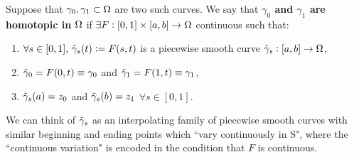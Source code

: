 \begin{definition}
Suppose that $\gamma_0, \gamma_1 \subset \Omega$ are two such curves. We say that \textbf{$\gamma_0$ and $\gamma_1$ are homotopic in $\Omega$} if $\exists F : [0,1] \times [a,b] \to \Omega$ continuous such that:
\begin{enumerate}
    \item $\forall s \in [0,1] , \, \Tilde{\gamma}_s(t) \vcentcolon = F(s,t)$ is a piecewise smooth curve $\Tilde{\gamma}_s : [a,b] \to \Omega$,
    \item $\Tilde{\gamma}_0 = F(0,t) \equiv \gamma_0$ and $\Tilde{\gamma}_1 = F(1,t) \equiv \gamma_1$,
    \item $\Tilde{\gamma}_s(a) = z_0$ and $\Tilde{\gamma}_s(b) = z_1$ $\forall s \in [0,1]$.
\end{enumerate}

\begin{center}
\end{center}

\end{definition}

We can think of $\Tilde{\gamma}_s$ as an interpolating family of piecewise smooth curves with similar beginning and ending points which ``vary continuously in S", where the ``continuous variation" is encoded in the condition that $F$ is continuous.


